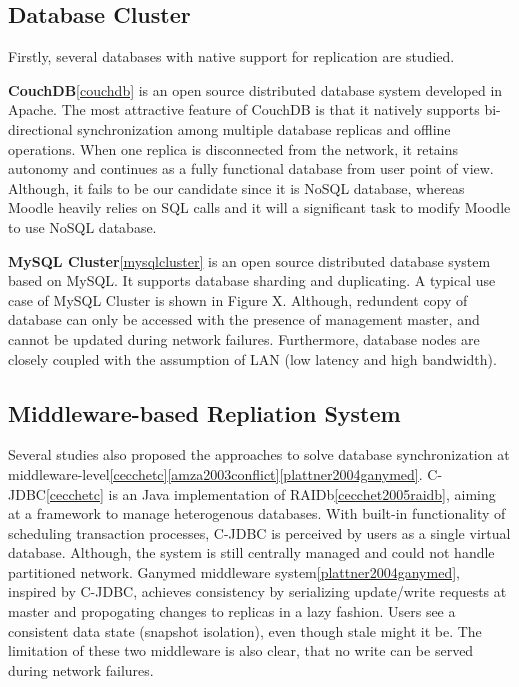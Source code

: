 \subsection{Database Cluster}
Firstly, several databases with native support for replication are studied.

\textbf{CouchDB}\ref{couchdb} is an open source distributed database system developed in Apache. The most attractive feature of CouchDB is that it natively supports bi-directional synchronization among multiple database replicas and offline operations. When one replica is disconnected from the network, it retains autonomy and continues as a fully functional database from user point of view. Although, it fails to be our candidate since it is NoSQL database, whereas Moodle heavily relies on SQL calls and it will a significant task to modify Moodle to use NoSQL database.

\textbf{MySQL Cluster}\ref{mysqlcluster} is an open source distributed database system based on MySQL. It supports database sharding and duplicating. A typical use case of MySQL Cluster is shown in Figure X. Although, redundent copy of database can only be accessed with the presence of management master, and cannot be updated during network failures. Furthermore, database nodes are closely coupled with the assumption of LAN (low latency and high bandwidth).

\subsection{Middleware-based Repliation System}
Several studies also proposed the approaches to solve database synchronization at middleware-level\ref{cecchetc}\ref{amza2003conflict}\ref{plattner2004ganymed}. C-JDBC\ref{cecchetc} is an Java implementation of RAIDb\ref{cecchet2005raidb}, aiming at a framework to manage heterogenous databases. With built-in functionality of scheduling transaction processes, C-JDBC is perceived by users as a single virtual database. Although, the system is still centrally managed and could not handle partitioned network. Ganymed middleware system\ref{plattner2004ganymed}, inspired by C-JDBC, achieves consistency by serializing update/write requests at master and propogating changes to replicas in a lazy fashion. Users see a consistent data state (snapshot isolation), even though stale might it be. The limitation of these two middleware is also clear, that no write can be served during network failures.


